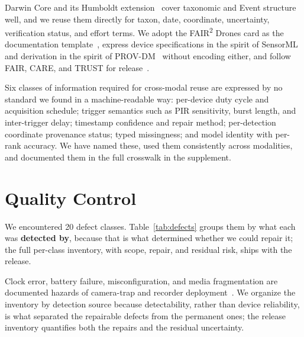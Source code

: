 \documentclass[sigconf]{acmart}
\begin{document}
Darwin Core and its Humboldt extension~\cite{tdwgHumboldt} cover
taxonomic and Event structure well, and we reuse them directly for
taxon, date, coordinate, uncertainty, verification status, and effort
terms. We adopt the FAIR\textsuperscript{2} Drones card as the
documentation template~\cite{pierrat2025proximal}, express device
specifications in the spirit of SensorML~\cite{ogcSensorML} and
derivation in the spirit of PROV-DM~\cite{w3cProvDM} without encoding
either, and follow FAIR, CARE, and TRUST for
release~\cite{wilkinson2016fair,carroll2020care,lin2020trust}.

Six classes of information required for cross-modal reuse are
expressed by no standard we found in a machine-readable way: per-device
duty cycle and acquisition schedule; trigger semantics such as PIR
sensitivity, burst length, and inter-trigger delay; timestamp confidence
and repair method; per-detection coordinate provenance status; typed
missingness; and model identity with per-rank accuracy. We have named
these, used them consistently across modalities, and documented them
in the full crosswalk in the supplement.

\section{Quality Control}
\label{sec:qc}

We encountered 20 defect classes. Table~\ref{tab:defects} groups them
by what each was \textbf{detected by}, because that is what determined
whether we could repair it; the full per-class inventory, with scope,
repair, and residual risk, ships with the release.

Clock error, battery failure, misconfiguration, and media
fragmentation are documented hazards of camera-trap and recorder
deployment~\cite{lahozmonfort2021monitoring,ahumada2020wildlifeinsights,Pestell2025SmartCamera}.
We organize the inventory by detection
source because detectability, rather than device reliability, is what
separated the repairable defects from the permanent ones; the release
inventory quantifies both the repairs and the residual uncertainty.
\end{document}

